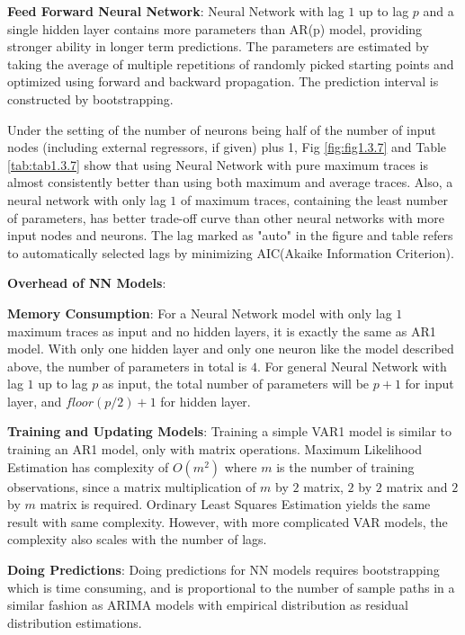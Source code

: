 \documentclass{article}
\begin{document}
\begin{flushleft}
\textbf{Feed Forward Neural Network}: Neural Network with lag $1$ up to lag $p$ and a single hidden layer contains more parameters than AR(p) model, providing stronger ability in longer term predictions. The parameters are estimated by taking the average of multiple repetitions of randomly picked starting points and optimized using forward and backward propagation. The prediction interval is constructed by bootstrapping. 
\end{flushleft}

\begin{flushleft}
Under the setting of the number of neurons being half of the number of input nodes (including external regressors, if given) plus 1, Fig \ref{fig:fig1.3.7} and Table \ref{tab:tab1.3.7} show that using Neural Network with pure maximum traces is almost consistently better than using both maximum and average traces. Also, a neural network with only lag $1$ of maximum traces, containing the least number of parameters, has better trade-off curve than other neural networks with more input nodes and neurons. The lag marked as "auto" in the figure and table refers to automatically selected lags by minimizing AIC(Akaike Information Criterion).
\end{flushleft}

\textbf{Overhead of NN Models}:
\begin{flushleft}
\textbf{Memory Consumption}: For a Neural Network model with only lag $1$ maximum traces as input and no hidden layers, it is exactly the same as AR1 model. With only one hidden layer and only one neuron like the model described above, the number of parameters in total is $4$. For general Neural Network with lag $1$ up to lag $p$ as input, the total number of parameters will be $p + 1$ for input layer, and $floor(p / 2) + 1$ for hidden layer.

\textbf{Training and Updating Models}: Training a simple VAR1 model is similar to training an AR1 model, only with matrix operations. Maximum Likelihood Estimation has complexity of $O(m^2)$ where $m$ is the number of training observations, since a matrix multiplication of $m$ by $2$ matrix, $2$ by $2$ matrix and $2$ by $m$ matrix is required. Ordinary Least Squares Estimation yields the same result with same complexity.
However, with more complicated VAR models, the complexity also scales with the number of lags. 

\textbf{Doing Predictions}: Doing predictions for NN models requires bootstrapping which is time consuming, and is proportional to the number of sample paths in a similar fashion as ARIMA models with empirical distribution as residual distribution estimations.  
\end{flushleft}
\end{document}
